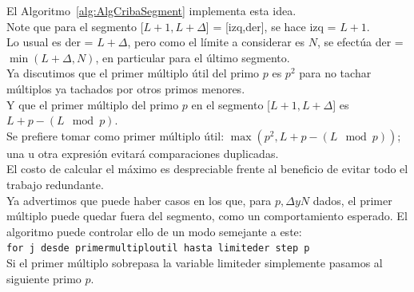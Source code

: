 El Algoritmo~\ref{alg:AlgCribaSegment} implementa esta idea.\\
Note que para el segmento [$L+1,L+\Delta$] = [izq,der], se hace izq = $L+1$.\\

Lo usual es der = $L+\Delta$, pero como el límite a considerar es $N$, se efectúa der = $\min(L+\Delta,N)$, en particular para el último segmento.\\ 

Ya discutimos que el primer múltiplo útil del primo $p$ es $p^{2}$ para no tachar múltiplos ya tachados por otros primos menores.\\
Y que el primer múltiplo del primo $p$ en el segmento [$L+1,L+\Delta$] es $L+p - (L \mod p)$.\\
Se prefiere tomar como primer múltiplo útil:  $\max(p^{2}, L+p - (L \mod p))$; una u otra expresión evitará comparaciones duplicadas.\\
El costo de calcular el máximo es despreciable frente al beneficio de evitar todo el trabajo redundante.\\ 

Ya advertimos que puede haber casos en los que, para $p, \Delta y N$ dados, el primer múltiplo puede quedar fuera del segmento, como un comportamiento esperado. El algoritmo puede controlar ello de un modo semejante a este:\\
\texttt{for j desde primermultiploutil hasta limiteder step p}\\

Si el primer múltiplo sobrepasa la variable limiteder simplemente pasamos al siguiente primo $p$.

